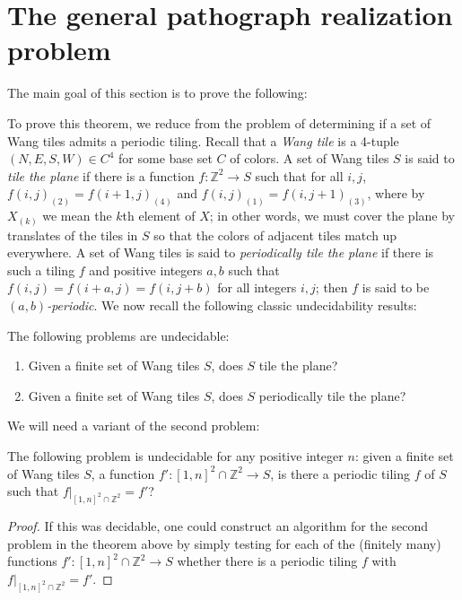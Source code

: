 \documentclass{article}
\newcommand{\Z}{\mathbb{Z}}
\begin{document}
\section{The general pathograph realization problem}
\label{sec:undecidable}

The main goal of this section is to prove the following:

\undecidable*

To prove this theorem, we reduce from the problem of determining if a set of Wang tiles admits a periodic tiling. Recall that a \textit{Wang tile} is a 4-tuple $(N, E, S, W)\in C^4$ for some base set $C$ of colors. A set of Wang tiles $S$ is said to \textit{tile the plane} if there is a function $f:\Z^2\to S$ such that for all $i,j$, $f(i,j)_{(2)}=f(i+1,j)_{(4)}$ and $f(i,j)_{(1)}=f(i,j+1)_{(3)}$, where by $X_{(k)}$ we mean the $k$th element of $X$; in other words, we must cover the plane by translates of the tiles in $S$ so that the colors of adjacent tiles match up everywhere. A set of Wang tiles is said to \textit{periodically tile the plane} if there is such a tiling $f$ and positive integers $a,b$ such that $f(i,j)=f(i+a,j)=f(i,j+b)$ for all integers $i,j$; then $f$ is said to be \textit{$(a,b)$-periodic}. We now recall the following classic undecidability results:

\begin{theorem*}\label{thm:wangundecidable}
The following problems are undecidable:
\begin{enumerate}
    \item Given a finite set of Wang tiles $S$, does $S$ tile the plane? \cite{berger}
    \item Given a finite set of Wang tiles $S$, does $S$ periodically tile the plane? \cite{gk}
\end{enumerate}
\end{theorem*}

We will need a variant of the second problem:

\begin{corollary}\label{cor:specialundecidable}
The following problem is undecidable for any positive integer $n$: given a finite set of Wang tiles $S$, a function $f':[1,n]^2\cap \Z^2 \to S$, is there a periodic tiling $f$ of $S$ such that $f|_{[1,n]^2\cap \Z^2}=f'$?
\end{corollary}
\begin{proof}
If this was decidable, one could construct an algorithm for the second problem in the theorem above by simply testing for each of the (finitely many) functions $f':[1,n]^2\cap \Z^2 \to S$ whether there is a periodic tiling $f$ with $f|_{[1,n]^2\cap \Z^2}=f'$.
\end{proof}
\end{document}
